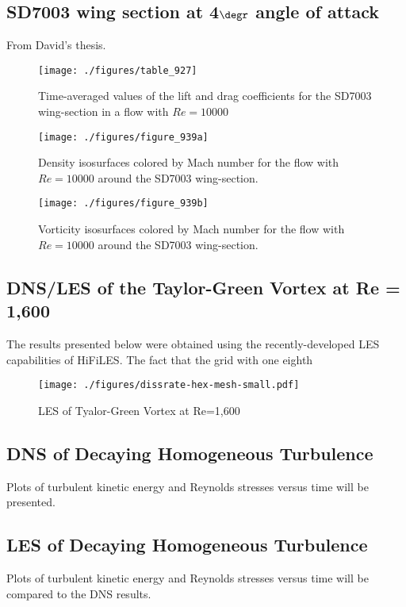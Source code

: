 \subsection{SD7003 wing section at 4$\degr$ angle of attack}
From David's thesis.

\begin{figure}
\centering
\texttt{[image: ./figures/table\_927]} \\
\caption{Time-averaged values of the lift and drag coefficients for the SD7003 wing-section in a flow with $Re = 10000$}
\label{fig:table_927}
\end{figure}

\begin{figure}
\centering
\texttt{[image: ./figures/figure\_939a]} \\
\caption{Density isosurfaces colored by Mach number for the flow with $Re = 10000$ around the SD7003 wing-section.}
\label{fig:figure_939a}
\end{figure}

\begin{figure}
\centering
\texttt{[image: ./figures/figure\_939b]} \\
\caption{Vorticity isosurfaces colored by Mach number for the flow with $Re = 10000$ around the SD7003 wing-section.}
\label{fig:figure_939b}
\end{figure}
\newpage
\subsection{DNS/LES of the Taylor-Green Vortex at Re = 1,600}
The results presented below were obtained using the recently-developed LES capabilities of HiFiLES. The fact that the grid with one eighth 
\begin{figure}
\centering
\texttt{[image: ./figures/dissrate-hex-mesh-small.pdf]} \\
\caption{LES of Tyalor-Green Vortex at Re=1,600\cite{bull2013a}}
\label{fig:setup}
\end{figure}

\newpage
\subsection{DNS of Decaying Homogeneous Turbulence}
Plots of turbulent kinetic energy and Reynolds stresses versus time will be presented.
\subsection{LES of Decaying Homogeneous Turbulence}
Plots of turbulent kinetic energy and Reynolds stresses versus time will be compared to the DNS results.


